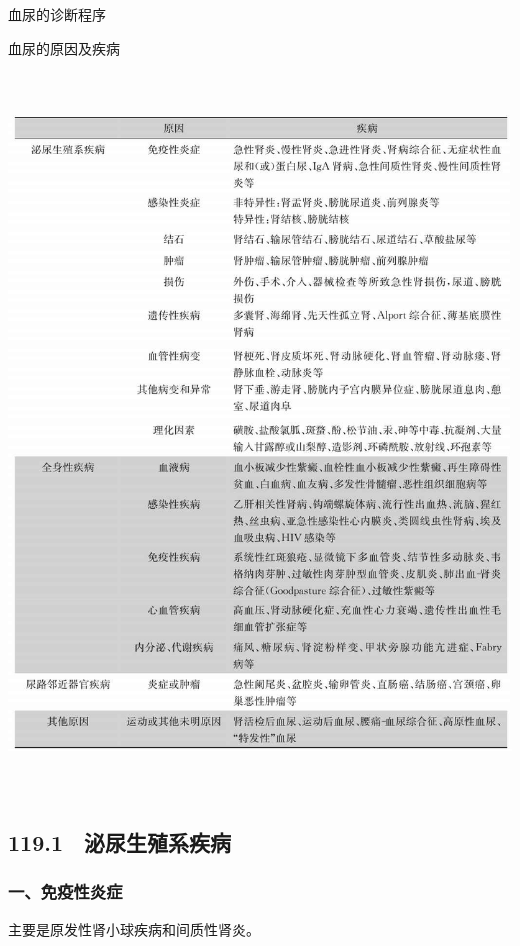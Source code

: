 血尿的诊断程序

\begin{table}[htbp]
\centering
\caption{血尿的原因及疾病}
\label{tab36-1}
\includegraphics[width=5.95833in,height=7.52083in]{./images/Image00224.jpg}
\end{table}

\protect\hypertarget{text00277.html}{}{}

\subsection{119.1　泌尿生殖系疾病}

\subsubsection{一、免疫性炎症}

主要是原发性肾小球疾病和间质性肾炎。

